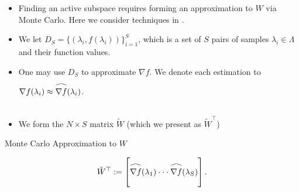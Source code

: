 \documentclass[11pt]{beamer}
\newcommand\reallywidehat[1]{\arraycolsep=0pt\relax%
\begin{array}{c}
\stretchto{
  \scaleto{
    \scalerel*[\widthof{\ensuremath{#1}}]{\kern-.5pt\bigwedge\kern-.5pt}
    {\rule[-\textheight/2]{1ex}{\textheight}} %
  }{\textheight} %
}{0.5ex}\\           %
#1\\                 %
\rule{-1ex}{0ex}
\end{array}
}
\begin{document}
\begin{frame}

\begin{itemize}

\item Finding an active subspace requires forming an approximation to $W$ via Monte Carlo. Here we consider techniques in \footnotemark[1] \footnotemark[2].



\item We let $D_S=\{(\lambda_i,f(\lambda_i))\}_{i=1}^S$, which is a set of $S$ pairs of samples $\lambda_i \in \Lambda$ and their function values. 

\item One may use $D_S$ to approximate $\nabla f$. We denote each estimation to $\nabla f(\lambda_i) \approx \reallywidehat{\nabla f}(\lambda_i)$.

\item We form the $N \times S$ matrix $\tilde{W}$ (which we present as $\tilde{W}^\top$)

\end{itemize}

\begin{block}{Monte Carlo Approximation to $W$ \footnotemark[1]}


\begin{equation} \label{eq:4}
\tilde{W}^\top:=\begin{bmatrix}
\reallywidehat{\nabla f}(\lambda_1)
\cdot \cdot \cdot
\reallywidehat{\nabla f}(\lambda_S)\\
\end{bmatrix}.
\end{equation}  

\end{block}


\end{frame}
\end{document}
